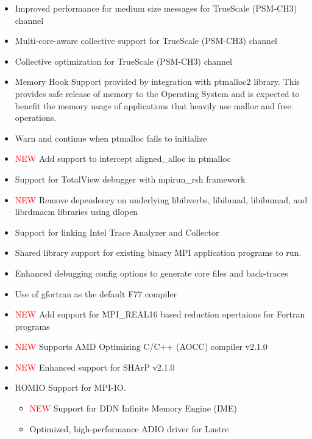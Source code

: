 \begin{itemize}
  \item  Improved performance for medium size messages for TrueScale (PSM-CH3) channel

  \item  Multi-core-aware collective support for TrueScale (PSM-CH3) channel

  \item  Collective optimization for TrueScale (PSM-CH3) channel

  \item  Memory Hook Support provided by integration with ptmalloc2
  library. This provides safe release of memory to the Operating
  System and is expected to benefit the memory usage of applications
  that heavily use malloc and free operations. 

  \item  Warn and continue when ptmalloc fails to initialize
  \item \textcolor{red}{NEW} Add support to intercept aligned\_alloc in ptmalloc

  \item  Support for TotalView debugger with mpirun\_rsh framework  

  \item \textcolor{red}{NEW} Remove dependency on underlying libibverbs,
      libibmad, libibumad, and librdmacm libraries using dlopen

  \item  Support for linking Intel Trace Analyzer and Collector

  \item  Shared library support for existing binary MPI application 
       programs to run. 
   \item  Enhanced debugging config options to generate core files and back-traces
   \item  Use of gfortran as the default F77 compiler 
   \item \textcolor{red}{NEW}  Add support for MPI\_REAL16 based reduction opertaions for Fortran programs 
   \item  \textcolor{red}{NEW} Supports AMD Optimizing C/C++ (AOCC) compiler v2.1.0 
   \item  \textcolor{red}{NEW} Enhanced support for SHArP v2.1.0

  \item  ROMIO Support for MPI-IO. 
      \begin{itemize}
       \item  \textcolor{red}{NEW} Support for DDN Infinite Memory Engine (IME)
       \item  Optimized, high-performance ADIO driver for Lustre
      \end{itemize}


\end{itemize}
